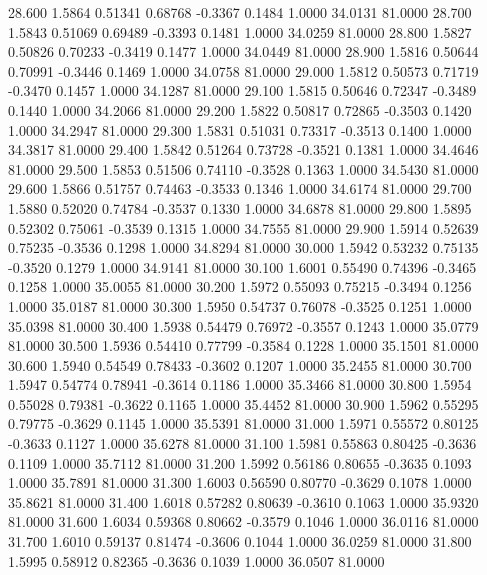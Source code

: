   28.600   1.5864   0.51341   0.68768  -0.3367   0.1484   1.0000  34.0131  81.0000
  28.700   1.5843   0.51069   0.69489  -0.3393   0.1481   1.0000  34.0259  81.0000
  28.800   1.5827   0.50826   0.70233  -0.3419   0.1477   1.0000  34.0449  81.0000
  28.900   1.5816   0.50644   0.70991  -0.3446   0.1469   1.0000  34.0758  81.0000
  29.000   1.5812   0.50573   0.71719  -0.3470   0.1457   1.0000  34.1287  81.0000
  29.100   1.5815   0.50646   0.72347  -0.3489   0.1440   1.0000  34.2066  81.0000
  29.200   1.5822   0.50817   0.72865  -0.3503   0.1420   1.0000  34.2947  81.0000
  29.300   1.5831   0.51031   0.73317  -0.3513   0.1400   1.0000  34.3817  81.0000
  29.400   1.5842   0.51264   0.73728  -0.3521   0.1381   1.0000  34.4646  81.0000
  29.500   1.5853   0.51506   0.74110  -0.3528   0.1363   1.0000  34.5430  81.0000
  29.600   1.5866   0.51757   0.74463  -0.3533   0.1346   1.0000  34.6174  81.0000
  29.700   1.5880   0.52020   0.74784  -0.3537   0.1330   1.0000  34.6878  81.0000
  29.800   1.5895   0.52302   0.75061  -0.3539   0.1315   1.0000  34.7555  81.0000
  29.900   1.5914   0.52639   0.75235  -0.3536   0.1298   1.0000  34.8294  81.0000
  30.000   1.5942   0.53232   0.75135  -0.3520   0.1279   1.0000  34.9141  81.0000
  30.100   1.6001   0.55490   0.74396  -0.3465   0.1258   1.0000  35.0055  81.0000
  30.200   1.5972   0.55093   0.75215  -0.3494   0.1256   1.0000  35.0187  81.0000
  30.300   1.5950   0.54737   0.76078  -0.3525   0.1251   1.0000  35.0398  81.0000
  30.400   1.5938   0.54479   0.76972  -0.3557   0.1243   1.0000  35.0779  81.0000
  30.500   1.5936   0.54410   0.77799  -0.3584   0.1228   1.0000  35.1501  81.0000
  30.600   1.5940   0.54549   0.78433  -0.3602   0.1207   1.0000  35.2455  81.0000
  30.700   1.5947   0.54774   0.78941  -0.3614   0.1186   1.0000  35.3466  81.0000
  30.800   1.5954   0.55028   0.79381  -0.3622   0.1165   1.0000  35.4452  81.0000
  30.900   1.5962   0.55295   0.79775  -0.3629   0.1145   1.0000  35.5391  81.0000
  31.000   1.5971   0.55572   0.80125  -0.3633   0.1127   1.0000  35.6278  81.0000
  31.100   1.5981   0.55863   0.80425  -0.3636   0.1109   1.0000  35.7112  81.0000
  31.200   1.5992   0.56186   0.80655  -0.3635   0.1093   1.0000  35.7891  81.0000
  31.300   1.6003   0.56590   0.80770  -0.3629   0.1078   1.0000  35.8621  81.0000
  31.400   1.6018   0.57282   0.80639  -0.3610   0.1063   1.0000  35.9320  81.0000
  31.600   1.6034   0.59368   0.80662  -0.3579   0.1046   1.0000  36.0116  81.0000
  31.700   1.6010   0.59137   0.81474  -0.3606   0.1044   1.0000  36.0259  81.0000
  31.800   1.5995   0.58912   0.82365  -0.3636   0.1039   1.0000  36.0507  81.0000
